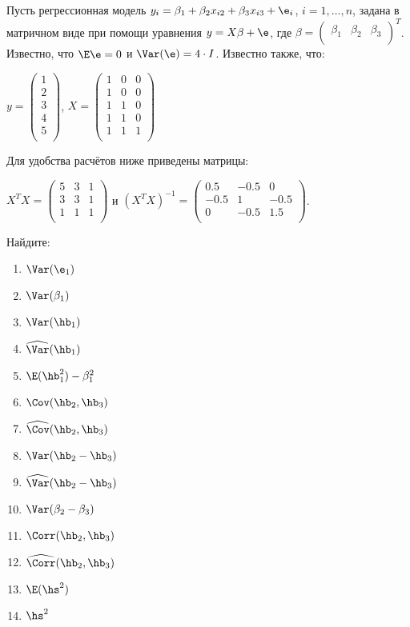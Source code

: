 \documentclass[pdftex,11pt,openany]{book}\usepackage[]{graphicx}\usepackage[]{color}
\begin{document}
\begin{problem}
Пусть регрессионная модель $y_i = \beta_1 + \beta_2 x_{i2} + \beta_3 x_{i3} + \e_i$, $i = 1, \ldots, n$, задана в матричном виде при помощи уравнения $y = X \beta + \e$, где $\beta =  \begin{pmatrix}
\beta_1 & \beta_2 & \beta_3\\
\end{pmatrix} ^T$. Известно, что $\E \e = 0$ и $\Var (\e) = 4 \cdot I$. Известно также, что:

$y =  \begin{pmatrix}
1 \\
2 \\
3 \\
4 \\
5 \\
\end{pmatrix} $, $X =  \begin{pmatrix}
1 & 0 & 0 \\
1 & 0 & 0 \\
1 & 1 & 0 \\
1 & 1 & 0 \\
1 & 1 & 1 \\
\end{pmatrix} $

Для удобства расчётов ниже приведены матрицы:

$X^T X =  \begin{pmatrix}
5 & 3 & 1 \\
3 & 3 & 1 \\
1 & 1 & 1 \\
\end{pmatrix} $ и $(X^T X)^{-1} =  \begin{pmatrix}
0.5 & -0.5 & 0 \\
-0.5 & 1 & -0.5 \\
0 & -0.5 & 1.5 \\
\end{pmatrix} $.

Найдите:
\begin{enumerate}
\item $\Var (\e_1)$
\item $\Var (\beta_1)$
\item $\Var (\hb_1)$
\item $\widehat{\Var }(\hb_1)$
\item $\E (\hb_1^2) - \beta_1^2$
\item $\Cov (\hb_2, \hb_3)$
\item $\widehat{\Cov }(\hb_2, \hb_3)$
\item $\Var (\hb_2 - \hb_3)$
\item $\widehat{\Var }(\hb_2 - \hb_3)$
\item $\Var (\beta_2 - \beta_3)$
\item $\Corr (\hb_2, \hb_3)$
\item $\widehat{\Corr}(\hb_2, \hb_3)$
\item $\E (\hs^2)$
\item $\hs^2$
\end{enumerate}
\end{problem}
\begin{solution}
\end{solution}
\end{document}
